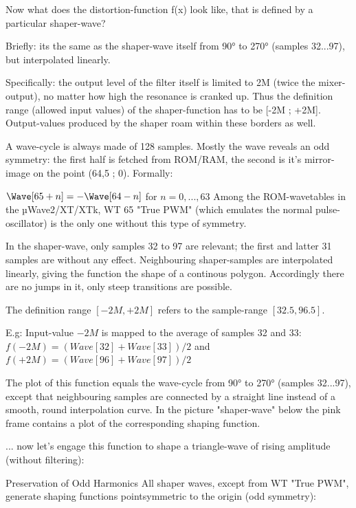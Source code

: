 	Now what does the distortion-function f(x) look like, that is defined by a particular shaper-wave?
	
	Briefly: its the same as the shaper-wave itself from 90° to 270° (samples 32...97), but interpolated linearly.
	
	Specifically: the output level of the filter itself is limited to 2M (twice the mixer-output), no matter how high the resonance is cranked up. Thus the definition range (allowed input values) of the shaper-function has to be [-2M ; +2M]. Output-values produced by the shaper roam within these borders as well.
	
	A wave-cycle is always made of 128 samples. Mostly the wave reveals an odd symmetry: the first half is fetched from ROM/RAM, the second is it's mirror-image on the point (64,5 ; 0). Formally:
	
	$\Wave[65 + n] = -\Wave[64 - n]$ for  $n = 0, ..., 63$
	Among the ROM-wavetables in the µWave2/XT/XTk, WT 65 "True PWM" (which emulates the normal pulse-oscillator) is the only one without this type of symmetry.
	
	In the shaper-wave, only samples 32 to 97 are relevant; the first and latter 31 samples are without any effect. Neighbouring shaper-samples are interpolated linearly, giving the function the shape of a continous polygon. Accordingly there are no jumps in it, only steep transitions are possible.
	
	The definition range $[-2M , +2M]$ refers to the sample-range $[32.5 , 96.5]$.
	
	E.g: Input-value $-2M$ is mapped to the average of samples 32 and 33:
	$f(-2M) = (Wave[32] + Wave[33]) / 2$ and $f(+2M) = (Wave[96] + Wave[97]) / 2$
	
	The plot of this function equals the wave-cycle from 90° to 270° (samples 32...97), except that neighbouring samples are connected by a straight line instead of a smooth, round interpolation curve. In the picture "shaper-wave" below the pink frame contains a plot of the corresponding shaping function.
	
	
	
	
	... now let's engage this function to shape a triangle-wave of rising amplitude (without filtering):
	
	
	
	
	
	
	
	Preservation of Odd Harmonics
	All shaper waves, except from WT "True PWM", generate shaping functions pointsymmetric to the origin (odd symmetry):
	
